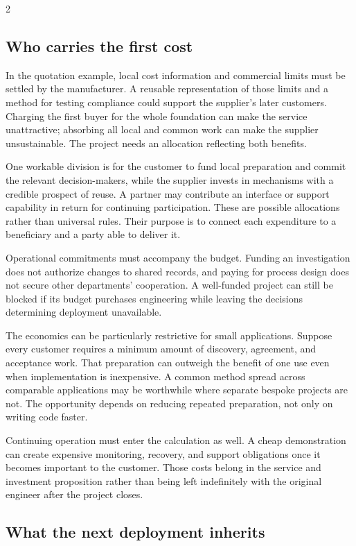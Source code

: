 \begin{multicols}{2}
\subsection{Who carries the first
cost}\label{who-carries-the-first-cost}

In the quotation example, local cost information and commercial limits
must be settled by the manufacturer. A reusable representation of those
limits and a method for testing compliance could support the supplier's
later customers. Charging the first buyer for the whole foundation can
make the service unattractive; absorbing all local and common work can
make the supplier unsustainable. The project needs an allocation
reflecting both benefits.

One workable division is for the customer to fund local preparation and
commit the relevant decision-makers, while the supplier invests in
mechanisms with a credible prospect of reuse. A partner may contribute
an interface or support capability in return for continuing
participation. These are possible allocations rather than universal
rules. Their purpose is to connect each expenditure to a beneficiary and
a party able to deliver it.

Operational commitments must accompany the budget. Funding an
investigation does not authorize changes to shared records, and paying
for process design does not secure other departments' cooperation. A
well-funded project can still be blocked if its budget purchases
engineering while leaving the decisions determining deployment
unavailable.

The economics can be particularly restrictive for small applications.
Suppose every customer requires a minimum amount of discovery,
agreement, and acceptance work. That preparation can outweigh the
benefit of one use even when implementation is inexpensive. A common
method spread across comparable applications may be worthwhile where
separate bespoke projects are not. The opportunity depends on reducing
repeated preparation, not only on writing code faster.

Continuing operation must enter the calculation as well. A cheap
demonstration can create expensive monitoring, recovery, and support
obligations once it becomes important to the customer. Those costs
belong in the service and investment proposition rather than being left
indefinitely with the original engineer after the project closes.

\subsection{What the next deployment
inherits}\label{what-the-next-deployment-inherits}


\end{multicols}
